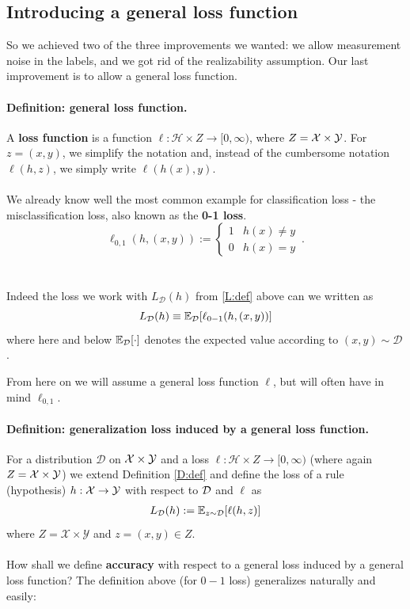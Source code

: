\documentclass[11pt]{article}
\newcommand{\Dc}{\mathcal{D}}
\newcommand{\Xc}{\mathcal{X}}
\newcommand{\Yc}{\mathcal{Y}}
\newcommand{\Hc}{\mathcal{H}}
\begin{document}
\subsection{Introducing a general loss function}

So we achieved two of the three improvements we wanted: we allow measurement
noise in the labels, and we got rid of the realizability assumption. 
Our last improvement is to allow a general loss function.
 \paragraph{Definition:  general loss function.}
 A {\bf loss function} is a function $\ell:\Hc \times Z\to[0,\infty)$, where 
 $Z = \mathcal{X}\times\mathcal{Y}$.
For  $z=(x,y)$, we simplify the notation and, instead of the cumbersome notation
$\ell(h,z)$, we simply write  $\ell(h(x),y)$.
\\~\\
We already know well the most common example for classification loss - the
misclassification loss, also known as the  {\bf 0-1 loss}.
\[
    \ell_{0,1}(h,(x,y)):=
    \begin{cases}
        1 & h(x)\neq y\\
        0 & h(x)= y
\end{cases}\,.
\]
\\~\\
Indeed the loss we work with $L_\Dc(h)$ from \eqref{L:def} above can we written
as 
\[
    L_\Dc(h) \equiv \E_\Dc [\ell_{0-1}(h,(x,y))]
\]
where here and below $\E_\Dc[\cdot]$ denotes the expected value according to
$(x,y)\sim \Dc$. 

From here on we will assume a general loss function $\ell$, but will often
have in mind $\ell_{0,1}$.

\paragraph{Definition: generalization loss induced by a general loss function.}
 For a distribution $\Dc$ on $\mathcal{X}\times\mathcal{Y}$ and a loss $\ell:\Hc\times Z\to[0,\infty)$
 (where again $Z=\mathcal{X}\times \mathcal{Y}$) we
 extend Definition \ref{D:def} and define the loss of a rule (hypothesis)
 $h:\mathcal{X}\to\mathcal{Y}$ with respect to $\mathcal{D}$ and $\ell$ as
 \begin{eqnarray*}
     L_\Dc(h) := \E_{z\sim\Dc}[\ell(h,z)]
 \end{eqnarray*}
 where $Z=\Xc\times\Yc$ and $z=(x,y)\in Z$.
\\~\\
How shall we define {\bf accuracy} with respect to a general loss induced by a
general loss function? The definition above (for $0-1$ loss) generalizes
naturally and easily:
%
\end{document}
